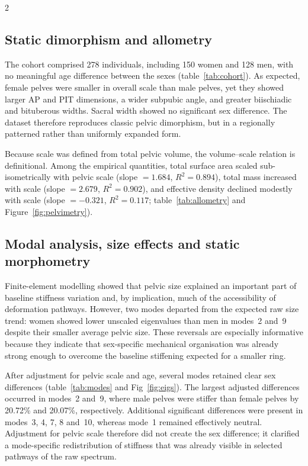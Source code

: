 \documentclass[openacc]{rsproca_new}
\begin{document}
\begin{multicols}{2}
\subsection{Static dimorphism and allometry}

The cohort comprised 278 individuals, including 150 women and 128 men, with no meaningful age difference between the sexes (table~\ref{tab:cohort}). As expected, female pelves were smaller in overall scale than male pelves, yet they showed larger AP and PIT dimensions, a wider subpubic angle, and greater biischiadic and bituberous widths. Sacral width showed no significant sex difference. The dataset therefore reproduces classic pelvic dimorphism, but in a regionally patterned rather than uniformly expanded form.

Because scale was defined from total pelvic volume, the volume--scale relation is definitional. Among the empirical quantities, total surface area scaled sub-isometrically with pelvic scale (slope $=1.684$, $R^2=0.894$), total mass increased with scale (slope $=2.679$, $R^2=0.902$), and effective density declined modestly with scale (slope $=-0.321$, $R^2=0.117$; table~\ref{tab:allometry} and Figure~\ref{fig:pelvimetry}).

\subsection{Modal analysis, size effects and static morphometry}

Finite-element modelling showed that pelvic size explained an important part of baseline stiffness variation and, by implication, much of the accessibility of deformation pathways. However, two modes departed from the expected raw size trend: women showed lower unscaled eigenvalues than men in modes~2 and~9 despite their smaller average pelvic size. These reversals are especially informative because they indicate that sex-specific mechanical organisation was already strong enough to overcome the baseline stiffening expected for a smaller ring.

After adjustment for pelvic scale and age, several modes retained clear sex differences (table~\ref{tab:modes} and Fig~\ref{fig:eigs}). The largest adjusted differences occurred in modes~2 and~9, where male pelves were stiffer than female pelves by 20.72\% and 20.07\%, respectively. Additional significant differences were present in modes~3, 4, 7, 8 and~10, whereas mode~1 remained effectively neutral. Adjustment for pelvic scale therefore did not create the sex difference; it clarified a mode-specific redistribution of stiffness that was already visible in selected pathways of the raw spectrum.


\end{multicols}
\end{document}
